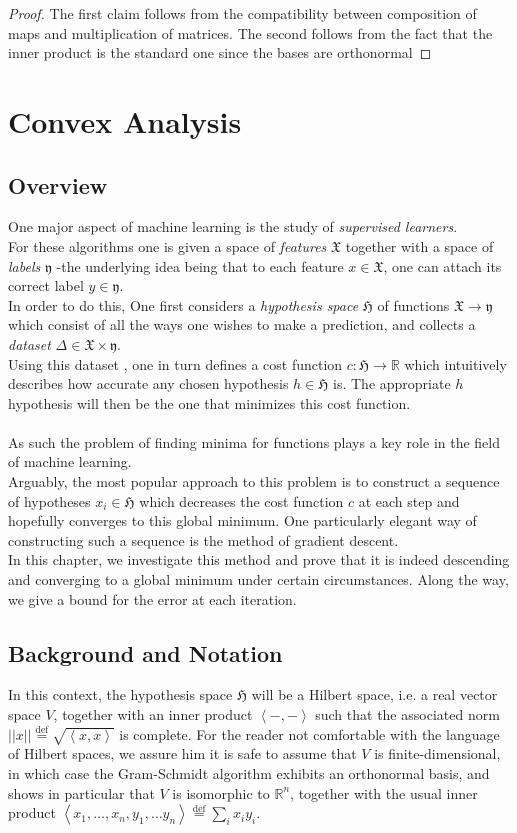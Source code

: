 \documentclass{book}
\theoremstyle{plain}
\theoremstyle{definition}
\newcommand{\bl}[2]{\left\langle #1,#2\right\rangle}
\renewcommand{\d}[1]{\mathbb{#1}}
\newcommand{\define}{\stackrel{\operatorname{def}}{=}}
\newcommand{\f}[1]{\mathfrak{#1}}
\newcommand{\norm}[1]{\vert \vert #1 \vert \vert}
\newcommand{\mor}{\longrightarrow}
\begin{document}
\begin{proof}
	The first claim follows from the compatibility between composition of maps and multiplication of matrices. The second follows from the fact that the inner product is the standard one since the bases are orthonormal
\end{proof}

\chapter{Convex Analysis}



\section{Overview}
One major aspect of machine learning is the study of \emph{supervised learners}. \\
For these algorithms one is given a space of \emph{features} $\f{X}$ together with a space of \emph{labels} $\f{y}$ -the underlying idea being that to each feature $x \in \f{X}$, one can attach its correct label $y \in \f{y}$.\\ 
In order to do this, One first considers a \emph{hypothesis space} $\f{H}$ of functions $\f{X}\mor \f{y}$ which consist of all the ways one wishes to make a prediction, and collects a \emph{dataset} $\Delta \in \f{X}\times \f{y}$.\\
Using this dataset , one in turn defines a cost function $c: \f{H}\mor \d{R}$ which intuitively describes how accurate any chosen hypothesis $h \in \f{H}$ is. The appropriate $h$ hypothesis will then be the one that minimizes this cost function.\\\\
As such the problem of finding minima for functions plays a key role in the field of machine learning.\\
Arguably, the most popular approach to this problem is to construct a sequence of hypotheses $x_i \in \f{H}$ which decreases the cost function $c$ at each step and hopefully converges to this global minimum. One particularly elegant way of constructing such a sequence is the method of gradient descent.\\
In this chapter, we investigate this method and prove that it is indeed descending and converging to a global minimum under certain circumstances. Along the way, we give a bound for the error at each iteration.
\section{Background and Notation}
In this context, the hypothesis space $\f{H}$ will be a Hilbert space, i.e. a real vector space $V$, together with an inner product $\bl{-}{-}$ such that the associated norm $\norm{x}\define \sqrt{\bl{x}{x}}$  is complete. For the reader not comfortable with the language of Hilbert spaces,  we assure him it is safe to assume that $V$ is finite-dimensional, in which case the Gram-Schmidt algorithm exhibits an orthonormal basis, and shows in particular that  $V$ is isomorphic to $\d{R}^n$, together with the usual inner product $\bl{x_1,\ldots , x_n}{y_1,\ldots y_n}\define \sum_i x_iy_i$.\\
\end{document}

